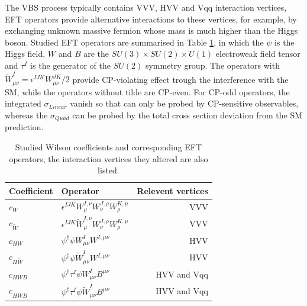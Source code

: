 \documentclass[a4paper,12pt]{article}
\begin{document}
			\par The VBS process typically contains VVV, HVV and Vqq interaction vertices, EFT operators provide alternative interactions to these 
			vertices, for example, by exchanging unknown massive fermion whose mass is much higher than the Higgs boson. Studied EFT operators 
			are summarised in Table \ref{tab:EFTcoe}, in which the $\psi$ is the Higgs field, $W$ and $B$ are the $SU(3)\times SU(2)\times U(1)$ electroweak field tensor  and $\tau^I$ is the generator 
			of the $SU(2)$ symmetry group. The operators with $\tilde{W}^I_{\mu\nu} = \epsilon^{IJK}W^{JK}_{\mu\nu}/2$ provide 
			CP-violating effect trough the interference with the SM, while the operators without tilde are CP-even.
			For CP-odd operators, the integrated $\sigma_{Linear}$ vanish\cite{Azatov_2017} so that can only be probed by CP-sensitive 
			observables, whereas the $\sigma_{Quad}$ can be probed by the total cross section deviation from the SM prediction.
			\begin{table}[ht!]
				\centering
				\renewcommand{\arraystretch}{1.1}
				\begin{tabularx}{0.75\textwidth}{X l r} 
				\hline\hline
				Coefficient  		& Operator 																	& Relevent vertices\\
				\hline
				$c_W$               & $\epsilon^{IJK}W_\mu^{I,\nu}W_{\nu}^{J,\rho}W_{\rho}^{K,\mu}$ 			& VVV\\
				$c_{\tilde{W}}$     & $\epsilon^{IJK}\tilde{W}_\mu^{I,\nu}W_{\nu}^{J,\rho}W_{\rho}^{K,\mu}$ 	& VVV\\
				\hline
				$c_{HW}$            & ${\psi^\dagger}{\psi}W_{\mu\nu}^IW^{I,\mu\nu}$ 							& HVV\\
				$c_{H\tilde{W}}$    & ${\psi^\dagger}{\psi}\tilde{W}_{\mu\nu}^IW^{I,\mu\nu}$ 					& HVV\\
				\hline
				$c_{HWB}$           & ${\psi^\dagger}\tau^I{\psi}W_{\mu\nu}^IB^{\mu\nu}$ 						& HVV and Vqq\\
				$c_{H\tilde{W}B}$   & ${\psi^\dagger}\tau^I{\psi}\tilde{W}_{\mu\nu}^IB^{\mu\nu}$ 				& HVV and Vqq\\           
				\hline\hline
				\end{tabularx}
				\caption{Studied Wilson coefficients and corresponding EFT operators, the interaction vertices they altered are also listed.}
				\label{tab:EFTcoe}
			\end{table}
\end{document}
